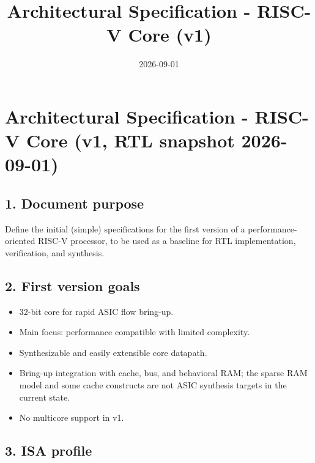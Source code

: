 \documentclass[]{article}
\title{Architectural Specification - RISC-V Core (v1)}
\date{2026-09-01}
\providecommand{\tightlist}{%
  \setlength{\itemsep}{0pt}\setlength{\parskip}{0pt}}
\begin{document}
\maketitle

\hypertarget{architectural-specification---risc-v-core-v1-rtl-snapshot-2026-09-01}{%
\section{Architectural Specification - RISC-V Core (v1, RTL snapshot
2026-09-01)}\label{architectural-specification---risc-v-core-v1-rtl-snapshot-2026-09-01}}

\hypertarget{1-document-purpose}{%
\subsection{1. Document purpose}\label{1-document-purpose}}

Define the initial (simple) specifications for the first version of a
performance-oriented RISC-V processor, to be used as a baseline for RTL
implementation, verification, and synthesis.

\hypertarget{2-first-version-goals}{%
\subsection{2. First version goals}\label{2-first-version-goals}}

\begin{itemize}
\tightlist
\item
  32-bit core for rapid ASIC flow bring-up.
\item
  Main focus: performance compatible with limited complexity.
\item
  Synthesizable and easily extensible core datapath.
\item
  Bring-up integration with cache, bus, and behavioral RAM; the sparse
  RAM model and some cache constructs are not ASIC synthesis targets in
  the current state.
\item
  No multicore support in v1.
\end{itemize}

\hypertarget{3-isa-profile}{%
\subsection{3. ISA profile}\label{3-isa-profile}}
\end{document}
